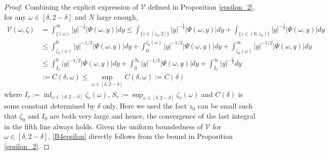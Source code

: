 \documentclass[11pt]{article}
\numberwithin{equation}{section}%
\numberwithin{theorem}{section}
\begin{document}
\begin{proof}
Combining the explicit expression of $\mathcal{V}$ defined in Proposition \ref{epsilon_2}, for any $\omega\in[\delta,2-\delta]$ and $N$ large enough,
    \begin{equation*}
    \begin{split}
\mathcal{V}(\omega,\zeta)&=\int_{\zeta(\omega)}^\infty|y|^{-\frac{1}{2}}|\Psi(\omega,y)|dy\le\int_{\{z\in[z_0,2]\}}|y|^{-\frac{1}{2}}|\Psi(\omega,y)|dy+\int_{\{z\in(0,z_0)\}}|y|^{-\frac{1}{2}}|\Psi(\omega,y)|dy\\
&\le\int_{\zeta_2(\omega)}^0|y|^{-1/2}|\Psi(\omega,y)|dy+\int_0^{\zeta_0(\omega)}|y|^{-1/2}|\Psi(\omega,y)|dy+\int_{\zeta_0(\omega)}^\infty|y|^{-1/2}|\Psi(\omega,y)|dy\\
&\le\int_{I_2}^0|y|^{-1/2}|\Psi(\omega,y)|dy+\int_0^{S_{0}}|y|^{-1/2}|\Psi(\omega,y)|dy+\int_{I_0}^\infty|y|^{-\frac{5}{2}}dy\\
&:= C(\delta,\omega)\le\sup\limits_{\omega\in[\delta,2-\delta]}C(\delta,\omega):=C(\delta)
    \end{split}
    \end{equation*}
    where $I_r:=\inf_{\omega\in[\delta,2-\delta]}\zeta_r(\omega)$, $S_r:=\sup_{\omega\in[\delta,2-\delta]}\zeta_r(\omega)$ and $C(\delta)$ is some constant determined by $\delta$ only. Here we used the fact $z_0$ can be small such that $\zeta_0$ and $I_0$ are both very large and hence, the convergence of the last integral in the fifth line always holds.
Given the uniform boundedness of $\mathcal{V}$ for $\omega\in[\delta,2-\delta]$, \eqref{B4epsilon} directly follows from the bound in Proposition \ref{epsilon_2}.
\end{proof}
\end{document}
